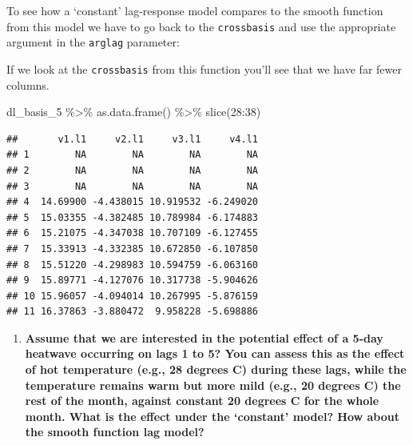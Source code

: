 \documentclass[
]{book}
\newenvironment{Shaded}{\begin{snugshade}}{\end{snugshade}}
\newcommand{\AttributeTok}[1]{\textcolor[rgb]{0.77,0.63,0.00}{#1}}
\newcommand{\DecValTok}[1]{\textcolor[rgb]{0.00,0.00,0.81}{#1}}
\newcommand{\FunctionTok}[1]{\textcolor[rgb]{0.00,0.00,0.00}{#1}}
\newcommand{\NormalTok}[1]{#1}
\newcommand{\OtherTok}[1]{\textcolor[rgb]{0.56,0.35,0.01}{#1}}
\newcommand{\SpecialCharTok}[1]{\textcolor[rgb]{0.00,0.00,0.00}{#1}}
\newcommand{\StringTok}[1]{\textcolor[rgb]{0.31,0.60,0.02}{#1}}
\providecommand{\tightlist}{%
  \setlength{\itemsep}{0pt}\setlength{\parskip}{0pt}}
\begin{document}
To see how a `constant' lag-response model compares to the smooth function from this model we have to go back to the \texttt{crossbasis} and use the appropriate argument in the \texttt{arglag} parameter:

\begin{Shaded}
\end{Shaded}

If we look at the \texttt{crossbasis} from this function you'll see that we have far fewer columns.

\begin{Shaded}
\begin{Highlighting}[]
\NormalTok{dl\_basis\_5 }\SpecialCharTok{\%\textgreater{}\%} 
  \FunctionTok{as.data.frame}\NormalTok{() }\SpecialCharTok{\%\textgreater{}\%} 
  \FunctionTok{slice}\NormalTok{(}\DecValTok{28}\SpecialCharTok{:}\DecValTok{38}\NormalTok{)}
\end{Highlighting}
\end{Shaded}

\begin{verbatim}
##       v1.l1     v2.l1     v3.l1     v4.l1
## 1        NA        NA        NA        NA
## 2        NA        NA        NA        NA
## 3        NA        NA        NA        NA
## 4  14.69900 -4.438015 10.919532 -6.249020
## 5  15.03355 -4.382485 10.789984 -6.174883
## 6  15.21075 -4.347038 10.707109 -6.127455
## 7  15.33913 -4.332385 10.672850 -6.107850
## 8  15.51220 -4.298983 10.594759 -6.063160
## 9  15.89771 -4.127076 10.317738 -5.904626
## 10 15.96057 -4.094014 10.267995 -5.876159
## 11 16.37863 -3.880472  9.958228 -5.698886
\end{verbatim}

\begin{enumerate}
\def\labelenumi{\arabic{enumi}.}
\setcounter{enumi}{3}
\tightlist
\item
  \textbf{Assume that we are interested in the potential effect of a 5-day
  heatwave occurring on lags 1 to 5? You can assess this as the effect of hot temperature
  (e.g., 28 degrees C) during these lags, while the temperature remains warm but more
  mild (e.g., 20 degrees C) the rest of the month, against constant 20 degrees C for
  the whole month. What is the effect under the `constant' model? How about the smooth
  function lag model?}
\end{enumerate}
\end{document}
